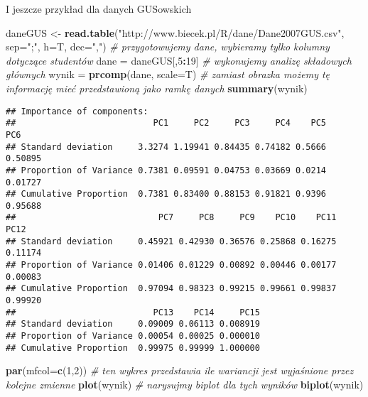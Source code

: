 \documentclass[polish,]{book}
\newenvironment{Shaded}{\begin{snugshade}}{\end{snugshade}}
\newcommand{\CommentTok}[1]{\textcolor[rgb]{0.56,0.35,0.01}{\textit{#1}}}
\newcommand{\DataTypeTok}[1]{\textcolor[rgb]{0.13,0.29,0.53}{#1}}
\newcommand{\DecValTok}[1]{\textcolor[rgb]{0.00,0.00,0.81}{#1}}
\newcommand{\KeywordTok}[1]{\textcolor[rgb]{0.13,0.29,0.53}{\textbf{#1}}}
\newcommand{\NormalTok}[1]{#1}
\newcommand{\OperatorTok}[1]{\textcolor[rgb]{0.81,0.36,0.00}{\textbf{#1}}}
\newcommand{\StringTok}[1]{\textcolor[rgb]{0.31,0.60,0.02}{#1}}
\begin{document}
I jeszcze przykład dla danych GUSowskich

\begin{Shaded}
\begin{Highlighting}[]
\NormalTok{daneGUS <-}\StringTok{ }\KeywordTok{read.table}\NormalTok{(}\StringTok{"http://www.biecek.pl/R/dane/Dane2007GUS.csv"}\NormalTok{, }\DataTypeTok{sep=}\StringTok{";"}\NormalTok{, }\DataTypeTok{h=}\NormalTok{T, }\DataTypeTok{dec=}\StringTok{","}\NormalTok{)}
\CommentTok{# przygotowujemy dane, wybieramy tylko kolumny dotyczące studentów}
\NormalTok{dane =}\StringTok{ }\NormalTok{daneGUS[,}\DecValTok{5}\OperatorTok{:}\DecValTok{19}\NormalTok{]}
\CommentTok{# wykonujemy analizę składowych głównych}
\NormalTok{wynik =}\StringTok{ }\KeywordTok{prcomp}\NormalTok{(dane, }\DataTypeTok{scale=}\NormalTok{T)}
\CommentTok{# zamiast obrazka możemy tę informację mieć przedstawioną jako ramkę danych}
\KeywordTok{summary}\NormalTok{(wynik)}
\end{Highlighting}
\end{Shaded}

\begin{verbatim}
## Importance of components:
##                           PC1     PC2     PC3     PC4    PC5     PC6
## Standard deviation     3.3274 1.19941 0.84435 0.74182 0.5666 0.50895
## Proportion of Variance 0.7381 0.09591 0.04753 0.03669 0.0214 0.01727
## Cumulative Proportion  0.7381 0.83400 0.88153 0.91821 0.9396 0.95688
##                            PC7     PC8     PC9    PC10    PC11    PC12
## Standard deviation     0.45921 0.42930 0.36576 0.25868 0.16275 0.11174
## Proportion of Variance 0.01406 0.01229 0.00892 0.00446 0.00177 0.00083
## Cumulative Proportion  0.97094 0.98323 0.99215 0.99661 0.99837 0.99920
##                           PC13    PC14     PC15
## Standard deviation     0.09009 0.06113 0.008919
## Proportion of Variance 0.00054 0.00025 0.000010
## Cumulative Proportion  0.99975 0.99999 1.000000
\end{verbatim}

\begin{Shaded}
\begin{Highlighting}[]
\KeywordTok{par}\NormalTok{(}\DataTypeTok{mfcol=}\KeywordTok{c}\NormalTok{(}\DecValTok{1}\NormalTok{,}\DecValTok{2}\NormalTok{))}
\CommentTok{# ten wykres przedstawia ile wariancji jest wyjaśnione przez kolejne zmienne}
\KeywordTok{plot}\NormalTok{(wynik)}
\CommentTok{# narysujmy biplot dla tych wyników}
\KeywordTok{biplot}\NormalTok{(wynik)}
\end{Highlighting}
\end{Shaded}
\end{document}
